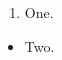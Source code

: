 \documentclass{article}
\begin{document}
\begin{enumerate}\item One.\end{enumerate}
\begin{itemize}\item Two.\end{itemize}
\end{document}

